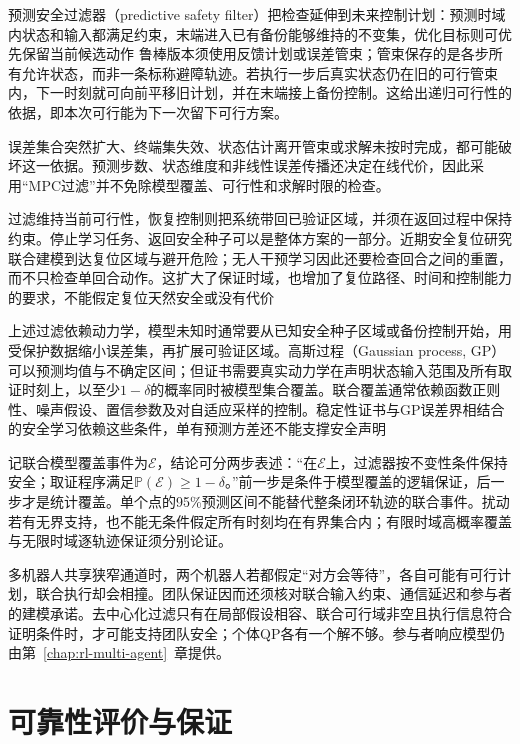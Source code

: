预测安全过滤器（predictive safety filter）把检查延伸到未来控制计划：预测时域内状态和输入都满足约束，末端进入已有备份能够维持的不变集，优化目标则可优先保留当前候选动作
鲁棒版本须使用反馈计划或误差管束；管束保存的是各步所有允许状态，而非一条标称避障轨迹。若执行一步后真实状态仍在旧的可行管束内，下一时刻就可向前平移旧计划，并在末端接上备份控制。这给出递归可行性的依据，即本次可行能为下一次留下可行方案。

误差集合突然扩大、终端集失效、状态估计离开管束或求解未按时完成，都可能破坏这一依据。预测步数、状态维度和非线性误差传播还决定在线代价，因此采用“MPC过滤”并不免除模型覆盖、可行性和求解时限的检查。

过滤维持当前可行性，恢复控制则把系统带回已验证区域，并须在返回过程中保持约束。停止学习任务、返回安全种子可以是整体方案的一部分。近期安全复位研究联合建模到达复位区域与避开危险；无人干预学习因此还要检查回合之间的重置，而不只检查单回合动作。这扩大了保证时域，也增加了复位路径、时间和控制能力的要求，不能假定复位天然安全或没有代价

上述过滤依赖动力学，模型未知时通常要从已知安全种子区域或备份控制开始，用受保护数据缩小误差集，再扩展可验证区域。高斯过程（Gaussian process, GP）可以预测均值与不确定区间；但证书需要真实动力学在声明状态输入范围及所有取证时刻上，以至少$1-\delta$的概率同时被模型集合覆盖。联合覆盖通常依赖函数正则性、噪声假设、置信参数及对自适应采样的控制。稳定性证书与GP误差界相结合的安全学习依赖这些条件，单有预测方差还不能支撑安全声明

记联合模型覆盖事件为$\mathcal E$，结论可分两步表述：“在$\mathcal E$上，过滤器按不变性条件保持安全；取证程序满足$\mathbb P(\mathcal E)\geq1-\delta$。”前一步是条件于模型覆盖的逻辑保证，后一步才是统计覆盖。单个点的95\%预测区间不能替代整条闭环轨迹的联合事件。扰动若有无界支持，也不能无条件假定所有时刻均在有界集合内；有限时域高概率覆盖与无限时域逐轨迹保证须分别论证。

多机器人共享狭窄通道时，两个机器人若都假定“对方会等待”，各自可能有可行计划，联合执行却会相撞。团队保证因而还须核对联合输入约束、通信延迟和参与者的建模承诺。去中心化过滤只有在局部假设相容、联合可行域非空且执行信息符合证明条件时，才可能支持团队安全；个体QP各有一个解不够。参与者响应模型仍由第~\ref{chap:rl-multi-agent}~章提供。

\section{可靠性评价与保证}
\label{sec:rl-trustworthy-evidence}

